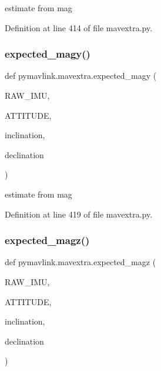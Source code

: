 \begin{DoxyVerb}estimate  from mag\end{DoxyVerb}
 

Definition at line 414 of file mavextra.\+py.

\mbox{\label{namespacepymavlink_1_1mavextra_a961c101c8246849d791424520b2439e7}} 
\subsubsection{\texorpdfstring{expected\_magy()}{expected\_magy()}}
{\footnotesize\ttfamily def pymavlink.\+mavextra.\+expected\+\_\+magy (\begin{DoxyParamCaption}\item[{}]{R\+A\+W\+\_\+\+I\+MU,  }\item[{}]{A\+T\+T\+I\+T\+U\+DE,  }\item[{}]{inclination,  }\item[{}]{declination }\end{DoxyParamCaption})}

\begin{DoxyVerb}estimate  from mag\end{DoxyVerb}
 

Definition at line 419 of file mavextra.\+py.

\mbox{\label{namespacepymavlink_1_1mavextra_a9c3e49062cce7a6cf181d0ed8a0e0692}} 
\subsubsection{\texorpdfstring{expected\_magz()}{expected\_magz()}}
{\footnotesize\ttfamily def pymavlink.\+mavextra.\+expected\+\_\+magz (\begin{DoxyParamCaption}\item[{}]{R\+A\+W\+\_\+\+I\+MU,  }\item[{}]{A\+T\+T\+I\+T\+U\+DE,  }\item[{}]{inclination,  }\item[{}]{declination }\end{DoxyParamCaption})}

